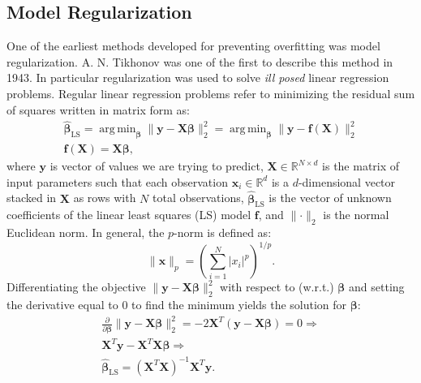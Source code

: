 \documentclass[a4paper, twoside, nobib]{tufte-book}
\newcommand{\abs}[1]{\lvert#1\rvert}
\newcommand{\norm}[1]{\lVert#1\rVert}
\renewcommand{\vec}[1]{\mathbf{#1}}
\DeclareMathOperator*{\argmin}{arg\,min} %
\begin{document}
\subsection{Model Regularization}
\label{subsec:regularization}
One of the earliest methods developed for preventing overfitting was model regularization. A. N. Tikhonov \citep{tikhonovStabilityInverseProblems1943} was one of the first to describe this method in \num{1943}. In particular regularization was used to solve \emph{ill posed} linear regression problems. Regular linear regression problems refer to minimizing the residual sum of squares written in matrix form as:
\begin{equation}
  \begin{split}
    \hat{\bm{\beta}}_{\mathrm{LS}} = \argmin_{\bm{\beta}} \norm{\vec{y} - \vec{X} \bm{\beta} }_2^2 = \argmin_{\bm{\beta}} \norm{ \vec{y} - \vec{f}(\vec{X}) }_2^2 \\
    \vec{f}(\vec{X}) = \vec{X} \bm{\beta},
  \end{split}
\end{equation}
where $\vec{y}$ is vector of values we are trying to predict, $\vec{X}\in\mathbb{R}^{N\times d}$ is the matrix of input parameters such that each observation $\vec{x}_i \in \mathbb{R}^d$ is a $d$-dimensional vector stacked in $\vec{X}$ as rows with $N$ total observations, $\hat{\bm{\beta}}_{\mathrm{LS}}$ is the vector of unknown coefficients of the linear least squares (LS) model $\vec{f}$, and $\norm{ \bm{\cdot} }_2$ is the normal Euclidean norm. In general, the $p$-norm is defined as:
\begin{equation}
  \norm{\vec{x}}_p = \left( \sum_{i=1}^N \abs{x_i}^p \right)^{1/p}.
\end{equation}
Differentiating the objective $\norm{\vec{y} - \vec{X} \bm{\beta} }_2^2$ with respect to (w.r.t.) $\bm{\beta}$ and setting the derivative equal to $0$ to find the minimum  yields the solution for $\bm{\beta}$:
\begin{equation}
  \begin{split}
    \frac{\partial}{\partial \bm{\beta}} \norm{\vec{y} - \vec{X} \bm{\beta} }_2^2 = -2 \vec{X}^T \left( \vec{y} - \vec{X} \bm{\beta} \right) = 0  \Rightarrow \\
    \vec{X}^T \vec{y} - \vec{X}^T \vec{X} \bm{\beta} \Rightarrow \\
    \hat{\bm{\beta}}_{\mathrm{LS}} =  \left( \vec{X}^T \vec{X} \right)^{-1} \vec{X}^T \vec{y}.
  \end{split}
\end{equation}
\end{document}
